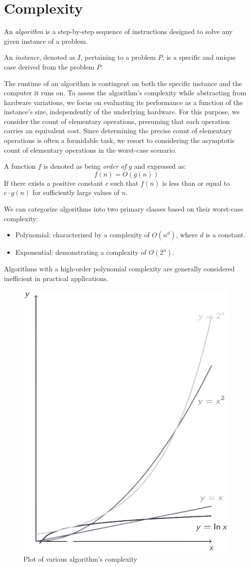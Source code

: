 \section{Complexity}

\begin{definition}
    An \emph{algorithm} is a step-by-step sequence of instructions designed to solve any given instance of a problem.

    An \emph{instance}, denoted as $I$, pertaining to a problem $P$, is a specific and unique case derived from the problem $P$.
\end{definition}

The runtime of an algorithm is contingent on both the specific instance and the computer it runs on. 
To assess the algorithm's complexity while abstracting from hardware variations, we focus on evaluating its performance as a function of the instance's size, independently of the underlying hardware. 
For this purpose, we consider the count of elementary operations, presuming that each operation carries an equivalent cost. 
Since determining the precise count of elementary operations is often a formidable task, we resort to considering the asymptotic count of elementary operations in the worst-case scenario.
\begin{definition}
    A function $f$ is denoted as being \emph{order of} $g$ and expressed as:
    \[f(n)=O(g(n))\]
    If there exists a positive constant $c$ such that $f(n)$ is less than or equal to $c \cdot g(n)$ for sufficiently large values of $n$.
\end{definition}
We can categorize algorithms into two primary classes based on their worst-case complexity:
\begin{itemize}
    \item Polynomial: characterized by a complexity of $O(n^d)$, where $d$ is a constant.
    \item Exponential: demonstrating a complexity of $O(2^n)$. 
\end{itemize}
Algorithms with a high-order polynomial complexity are generally considered inefficient in practical applications.
\begin{figure}[H]
    \centering
    \includegraphics[width=0.25\linewidth]{images/complexity.png}
    \caption{Plot of various algorithm's complexity}
\end{figure}
